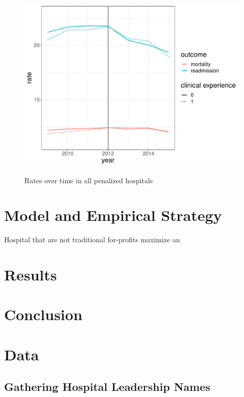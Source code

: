 \documentclass[12pt]{article}
\begin{document}
    \begin{figure}
        \centering
        \caption{Rates over time in all penalized hospitals}
        \includegraphics[scale=.7]{Objects/weighted_read_mort_graph.pdf}
        \label{fig:enter-label}
    \end{figure}

    \section{Model and Empirical Strategy}

    Hospital that are not traditional for-profits maximize an 

    \section{Results}

    \section{Conclusion}

	
	\newpage
	\appendix

    \section{Data}\label{appendixdata}

    \subsection{Gathering Hospital Leadership Names}
\end{document}
